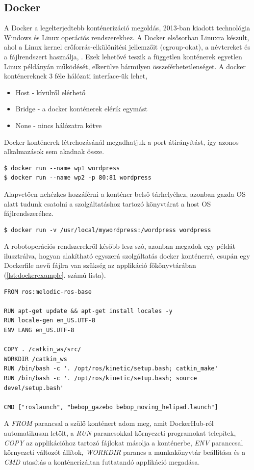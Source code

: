 \subsection{Docker}
A Docker a legelterjedtebb konténerizáció megoldás, 2013-ban kiadott technológia Windows és Linux operációs rendszerekhez. A Docker elsősorban Linuxra készült, ahol a Linux kernel erőforrás-elkülönítési jellemzőit (cgroup-okat), a névtereket és a fájlrendszert használja, . Ezek lehetővé teszik a független konténerek egyetlen Linux példányán működését, elkerülve bármilyen összeférhetetlenséget.
A docker konténereknek 3 féle hálózati interface-ük lehet,
\begin{itemize}
	\item Host - kívülről elérhető
	\item Bridge - a docker konténerek elérik egymást
	\item None - nincs hálózatra kötve
\end{itemize}
Docker konténerek létrehozásánál megadhatjuk a port átirányítást, így azonos alkalmazások sem akadnak össze.
\begin{lstlisting}[caption={Példa két WordPress szolgáltatás párhuzamos indítására a 80 és 81-es portokon}]
$ docker run --name wp1 wordpress
$ docker run --name wp2 -p 80:81 wordpress
\end{lstlisting}
Alapvetően nehézkes hozzáférni a konténer belső tárhelyéhez, azonban gazda OS alatt tudunk csatolni a szolgáltatáshoz tartozó könyvtárat a host OS fájlrendszeréhez.
\begin{lstlisting}[caption={Példa volume csatolásához}]
$ docker run -v /usr/local/mywordpress:/wordpress wordpress
\end{lstlisting}
A robotoperációs rendszerekről később lesz szó, azonban megadok egy példát ilusztrálva, hogyan alakítható egyszerá szolgáltatás docker konténerré, csupán egy Dockerfile nevű fájlra van szükség az applikáció főkönyvtárában (\ref{lst:dockerexample}. számú lista).

\begin{lstlisting}[caption={Példa alap robotoperációsrendszer konténerizációjához}, label={lst:dockerexample}]
FROM ros:melodic-ros-base

RUN apt-get update && apt-get install locales -y
RUN locale-gen en_US.UTF-8
ENV LANG en_US.UTF-8

COPY . /catkin_ws/src/
WORKDIR /catkin_ws
RUN /bin/bash -c '. /opt/ros/kinetic/setup.bash; catkin_make'
RUN /bin/bash -c '. /opt/ros/kinetic/setup.bash; source devel/setup.bash'

CMD ["roslaunch", "bebop_gazebo bebop_moving_helipad.launch"]
\end{lstlisting}
A \emph{FROM} parancsal a szülő konténert adom meg, amit DockerHub-ról automatikusan letölt, a \emph{RUN} parancsokkal környezeti programokat telepítek, \emph{COPY} az applikációhoz tartozó fájlokat másolja a konténerbe, \emph{ENV} paranccsal környezeti változót állítok, \emph{WORKDIR} parancs a munkakönyvtár beállítása és a \emph{CMD} utasítás a konténerizáltan futtatandó applikáció megadása.

